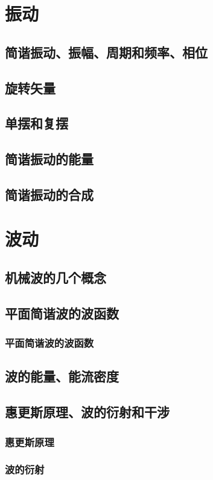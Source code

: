 \documentclass[UTF8,a4paper,12pt,scheme=chinese]{ctexbook}
\begin{document}
	\begin{Large}
		\chapter{振动}
		\section{简谐振动、振幅、周期和频率、相位}
		\section{旋转矢量}
		\section{单摆和复摆}
		\section{简谐振动的能量}
		\section{简谐振动的合成}
		\chapter{波动}
		\section{机械波的几个概念}
		\section{平面简谐波的波函数}
		\subsection{平面简谐波的波函数}
		\section{波的能量、能流密度}
		\section{惠更斯原理、波的衍射和干涉}
		\subsection{惠更斯原理}
		\subsection{波的衍射}

\end{Large}
\end{document}
